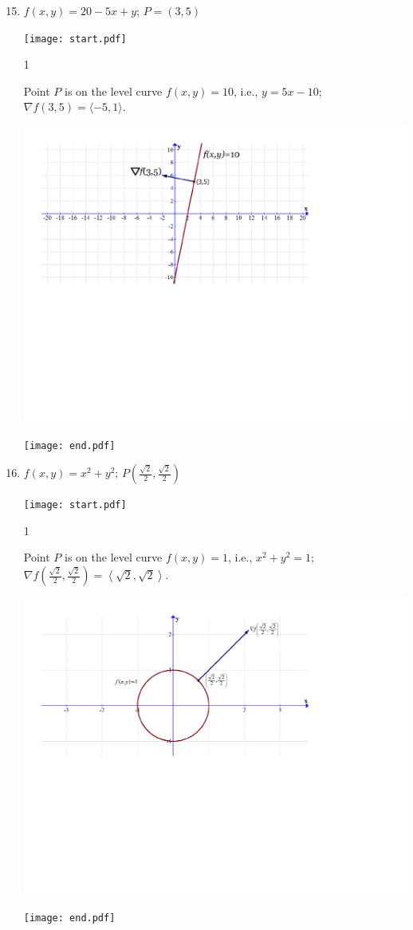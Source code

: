\documentclass[12pt]{article}
\begin{document}
\begin{enumerate}
\setcounter{enumi}{14}

\item $f(x,y)=20-5x+y$; $P=(3, 5)$

\texttt{[image: start.pdf]}
{{{1\linewidth}{Point $P$ is on the level curve $f(x,y)=10$, i.e., $y=5x-10$; $\nabla f(3,5)=\langle -5,1 \rangle$.
\begin{center}
\includegraphics[scale=0.6]{normal.pdf}
\end{center}
}}}
\texttt{[image: end.pdf]}


\newpage

\item $f(x,y)=x^2+y^2$; $P\left(\frac{\sqrt{2}}{2},\frac{\sqrt{2}}{2}\right)$

\texttt{[image: start.pdf]}
{{{1\linewidth}{Point $P$ is on the level curve $f(x,y)=1$, i.e., $x^2+y^2=1$; $\nabla f \left(\frac{\sqrt{2}}{2},\frac{\sqrt{2}}{2}\right)=\left\langle \sqrt{2},\sqrt{2} \right\rangle$.
\begin{center}
\includegraphics[scale=0.5]{normal2.pdf}
\end{center}
}}}
\texttt{[image: end.pdf]}



\end{enumerate}
\end{document}
